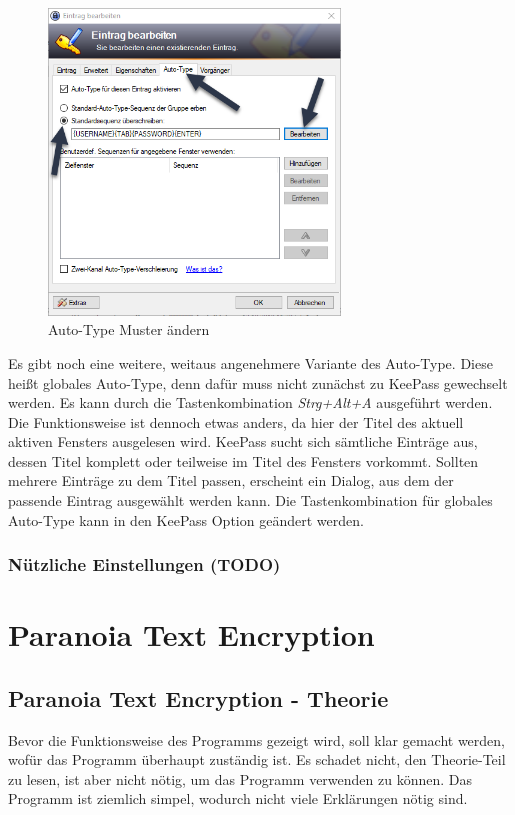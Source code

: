 \documentclass[12pt,a4paper]{scrreprt}
\begin{document}
\begin{figure}[h]
\begin{center}
\includegraphics[width=220pt]{media/kautotype.png}
\caption{Auto-Type Muster ändern}
\label{kautotype}
\end{center}
\end{figure}

\noindent Es gibt noch eine weitere, weitaus angenehmere Variante des Auto-Type. Diese heißt globales Auto-Type, denn dafür muss nicht zunächst zu KeePass gewechselt werden. Es kann durch die Tastenkombination \textit{Strg+Alt+A} ausgeführt werden. Die Funktionsweise ist dennoch etwas anders, da hier der Titel des aktuell aktiven Fensters ausgelesen wird. KeePass sucht sich sämtliche Einträge aus, dessen Titel komplett oder teilweise im Titel des Fensters vorkommt. Sollten mehrere Einträge zu dem Titel passen, erscheint ein Dialog, aus dem der passende Eintrag ausgewählt werden kann. Die Tastenkombination für globales Auto-Type kann in den KeePass Option geändert werden.

\newpage

\section{Nützliche Einstellungen (TODO)}

\part{Paranoia Text Encryption}

\chapter{Paranoia Text Encryption - Theorie}
Bevor die Funktionsweise des Programms gezeigt wird, soll klar gemacht werden, wofür das Programm überhaupt zuständig ist. Es schadet nicht, den Theorie-Teil zu lesen, ist aber nicht nötig, um das Programm verwenden zu können. Das Programm ist ziemlich simpel, wodurch nicht viele Erklärungen nötig sind.
\end{document}
